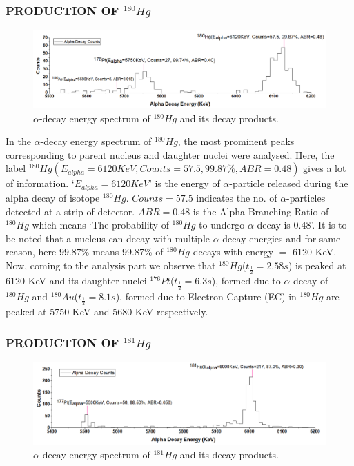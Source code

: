 \documentclass[12pt]{article}
\begin{document}
\subsubsection{PRODUCTION OF $^{180}Hg$}
\begin{figure}[h]
\centering
\includegraphics[scale=0.5]{Hg180.png}
\caption{$\alpha$-decay energy spectrum of $^{180}Hg$ and its decay products.}
\label{alpha-decay energy spectrum of 180Hg and its decay products.}
\end{figure}

In the $\alpha$-decay energy spectrum of $^{180}Hg$, the most prominent peaks corresponding to parent nucleus and daughter nuclei were analysed. Here, the label $^{180}Hg(E_{alpha}=6120KeV, Counts=57.5, 99.87\%, ABR=0.48)$ gives a lot of information. `$E_{alpha}=6120KeV$' is the energy of $\alpha$-particle released during the alpha decay of isotope $^{180}Hg$. $Counts=57.5$ indicates the no. of $\alpha$-particles detected at a strip of detector. $ABR=0.48$ is the Alpha Branching Ratio of $^{180}Hg$ which means `The probability of $^{180}Hg$ to undergo $\alpha$-decay is 0.48'. It is to be noted that a nucleus can decay with multiple $\alpha$-decay energies and for same reason, here $99.87\%$ means 99.87\% of $^{180}Hg$ decays with energy $=$ 6120 KeV. Now, coming to the analysis part we observe that $^{180}Hg$($t_\frac{1}{2}=2.58s$) is peaked at 6120 KeV and its daughter nuclei $^{176}Pt$($t_\frac{1}{2}=6.3s$), formed due to $\alpha$-decay of $^{180}Hg$ and $^{180}Au$($t_\frac{1}{2}=8.1s$), formed due to Electron Capture (EC) in $^{180}Hg$ are peaked at 5750 KeV and 5680 KeV respectively.


\subsubsection{PRODUCTION OF $^{181}Hg$}
\begin{figure}[h]
\centering
\includegraphics[scale=0.5]{Hg181.png}
\caption{$\alpha$-decay energy spectrum of $^{181}Hg$ and its decay products.}
\label{alpha-decay energy spectrum of 181Hg and its decay products.}
\end{figure}
\end{document}
